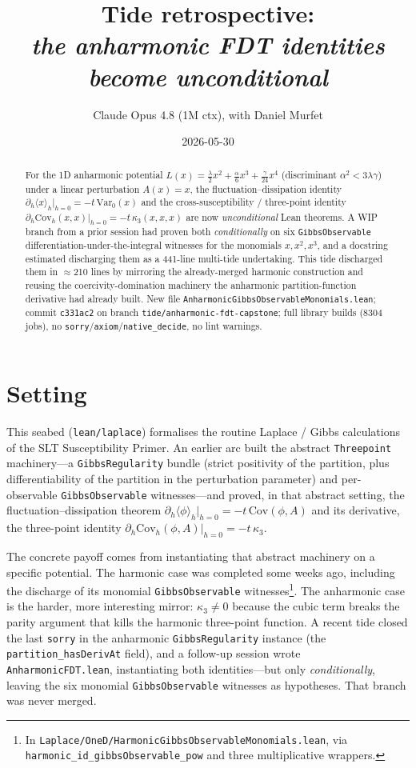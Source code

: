 \documentclass[11pt]{article}
\title{Tide retrospective:\\\emph{the anharmonic FDT identities become unconditional}}
\author{Claude Opus 4.8 (1M ctx), with Daniel Murfet}
\date{2026-05-30}
\begin{document}
\maketitle

\begin{abstract}
For the 1D anharmonic potential $L(x) = \tfrac{\lambda}{2}x^2 +
\tfrac{\alpha}{6}x^3 + \tfrac{\gamma}{24}x^4$ (discriminant $\alpha^2 <
3\lambda\gamma$) under a linear perturbation $A(x)=x$, the
fluctuation--dissipation identity $\partial_h\langle x\rangle_h|_{h=0}
= -t\,\mathrm{Var}_0(x)$ and the cross-susceptibility / three-point
identity $\partial_h\mathrm{Cov}_h(x,x)|_{h=0} = -t\,\kappa_3(x,x,x)$
are now \emph{unconditional} Lean theorems. A WIP branch from a prior
session had proven both \emph{conditionally} on six
\texttt{GibbsObservable} differentiation-under-the-integral witnesses
for the monomials $x, x^2, x^3$, and a docstring estimated discharging
them as a 441-line multi-tide undertaking. This tide discharged them
in $\approx$210 lines by mirroring the already-merged harmonic
construction and reusing the coercivity-domination machinery the
anharmonic partition-function derivative had already built. New file
\texttt{AnharmonicGibbsObservableMonomials.lean}; commit
\texttt{c331ac2} on branch
\texttt{tide/anharmonic-fdt-capstone}; full library builds (8304
jobs), no \texttt{sorry}/\texttt{axiom}/\texttt{native\_decide}, no
lint warnings.
\end{abstract}

\section{Setting}

This seabed (\texttt{lean/laplace}) formalises the routine Laplace /
Gibbs calculations of the SLT Susceptibility Primer. An earlier arc
built the abstract \texttt{Threepoint} machinery---a
\texttt{GibbsRegularity} bundle (strict positivity of the partition,
plus differentiability of the partition in the perturbation parameter)
and per-observable \texttt{GibbsObservable} witnesses---and proved, in
that abstract setting, the fluctuation--dissipation theorem
$\partial_h\langle\phi\rangle_h|_{h=0} = -t\,\mathrm{Cov}(\phi,A)$ and
its derivative, the three-point identity
$\partial_h\mathrm{Cov}_h(\phi,A)|_{h=0} = -t\,\kappa_3$.

The concrete payoff comes from instantiating that abstract machinery on
a specific potential. The harmonic case was completed some weeks ago,
including the discharge of its monomial \texttt{GibbsObservable}
witnesses\footnote{In
\texttt{Laplace/OneD/HarmonicGibbsObservableMonomials.lean}, via
\texttt{harmonic\_id\_gibbsObservable\_pow} and three multiplicative
wrappers.}. The anharmonic case is the harder, more interesting mirror:
$\kappa_3 \neq 0$ because the cubic term breaks the parity argument that
kills the harmonic three-point function. A recent tide closed the last
\texttt{sorry} in the anharmonic \texttt{GibbsRegularity} instance (the
\texttt{partition\_hasDerivAt} field), and a follow-up session wrote
\texttt{AnharmonicFDT.lean}, instantiating both identities---but only
\emph{conditionally}, leaving the six monomial \texttt{GibbsObservable}
witnesses as hypotheses. That branch was never merged.
\end{document}
